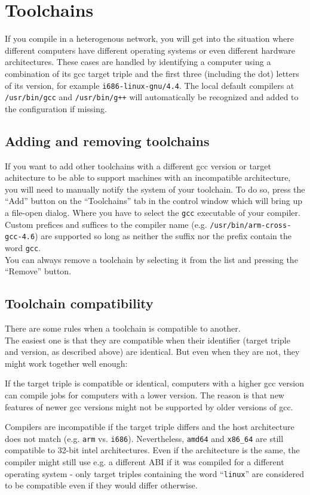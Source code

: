 \documentclass[a4paper,9pt]{scrartcl}
\begin{document}
\section{Toolchains}

If you compile in a heterogenous network, you will get into the situation where different computers have different operating systems or even different hardware architectures. These cases are handled by identifying a computer using a combination of its gcc target triple and the first three (including the dot) letters of its version, for example \texttt{i686-linux-gnu/4.4}. The local default compilers at \texttt{/usr/bin/gcc} and \texttt{/usr/bin/g++} will automatically be recognized and added to the configuration if missing.

\subsection{Adding and removing toolchains}

If you want to add other toolchains with a different gcc version or target achitecture to be able to support machines with an incompatible architecture, you will need to manually notify the system of your toolchain. To do so, press the ``Add'' button on the ``Toolchains'' tab in the control window which will bring up a file-open dialog. Where you have to select the \texttt{gcc} executable of your compiler. Custom prefices and suffices to the compiler name (e.g. \texttt{/usr/bin/arm-cross-gcc-4.6}) are supported so long as neither the suffix nor the prefix contain the word \texttt{gcc}. \\You can always remove a toolchain by selecting it from the list and pressing the ``Remove'' button.

\subsection{Toolchain compatibility}

There are some rules when a toolchain is compatible to another.\\
The easiest one is that they are compatible when their identifier (target triple and version, as described above) are identical. But even when they are not, they might work together well enough:\\
\smallskip

If the target triple is compatible or identical, computers with a higher gcc version can compile jobs for computers with a lower version. The reason is that new features of newer gcc versions might not be supported by older versions of gcc.\\
\smallskip

Compilers are incompatible if the target triple differs and the host architecture does not match (e.g. \texttt{arm} vs. \texttt{i686}). Nevertheless, \texttt{amd64} and \texttt{x86\_64} are still compatible to 32-bit intel architectures. Even if the architecture is the same, the compiler might still use e.g. a different ABI if it was compiled for a different operating system - only target triples containing the word ``\texttt{linux}'' are considered to be compatible even if they would differ otherwise.
\end{document}
